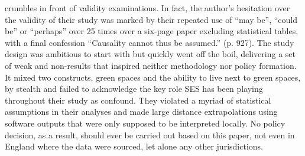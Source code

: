 \textcite{white:2013} crumbles in front of validity examinations. In fact, the author's hesitation over the validity of their study was marked by their repeated use of ``may be'', ``could be'' or ``perhaps'' over 25 times over a six-page paper excluding statistical tables, with a final confession ``Causality cannot thus be assumed.'' (p. 927). The study design was ambitious to start with but quickly went off the boil, delivering a set of weak and non-results that inspired neither methodology nor policy formation. It mixed two constructs, green spaces and the ability to live next to green spaces, by stealth and failed to acknowledge the key role SES has been playing throughout their study as confound. They violated a myriad of statistical assumptions in their analyses and made large distance extrapolations using software outputs that were only supposed to be interpreted locally. No policy decision, as a result, should ever be carried out based on this paper, not even in England where the data were sourced, let alone any other jurisdictions.